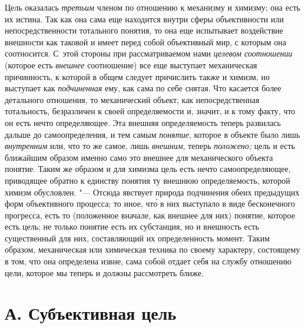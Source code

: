 Цель оказалась
{\em третьим} членом по
отношению к механизму и химизму; она есть их истина. Так как она сама еще
находится внутри сферы объективности или непосредственности тотального
понятия, то она еще испытывает воздействие внешности как таковой и имеет
перед собой объективный мир, с которым она соотносится. С~этой стороны при
рассматриваемом нами {\em целевом
соотношении} (которое есть
{\em внешнее}
соотношение) все еще выступает механическая причинность, к
которой в общем следует причислить также и химизм, но выступает как
{\em подчиненная} ему,
как сама по себе снятая. Что касается более детального отношения, то
механический объект, как непосредственная тотальность, безразличен к своей
определяемости и, значит, и к тому факту, что он есть нечто определяющее.
Эта внешняя определяемость теперь развилась дальше до самоопределения, и
тем самым {\em понятие},
которое в объекте было лишь
{\em внутренним} или, что
то же самое, лишь {\em внешним},
теперь {\em положено;}
цель и есть ближайшим образом именно само это внешнее для
механического объекта понятие. Таким же образом и для химизма цель есть
нечто самоопределяющее, приводящее обратно к единству понятия ту внешнюю
определяемость, которой химизм обусловлен. "--- Отсюда явствует
природа подчинения обеих предыдущих форм объективного процесса; то иное, чт\'{о}
 в них выступало в виде бесконечного прогресса, есть то (положенное
вначале, как внешнее для них) понятие, которое есть цель; не только понятие
есть их субстанция, но и внешность есть существенный для них, составляющий
их определенность момент. Таким образом, механическая или
химическая техника по своему характеру, состоящему в том, что она
определена извне, сама собой отдает себя на службу отношению цели, которое
мы теперь и должны рассмотреть ближе.

\section[А. Субъективная цель]{А. Субъективная цель}

